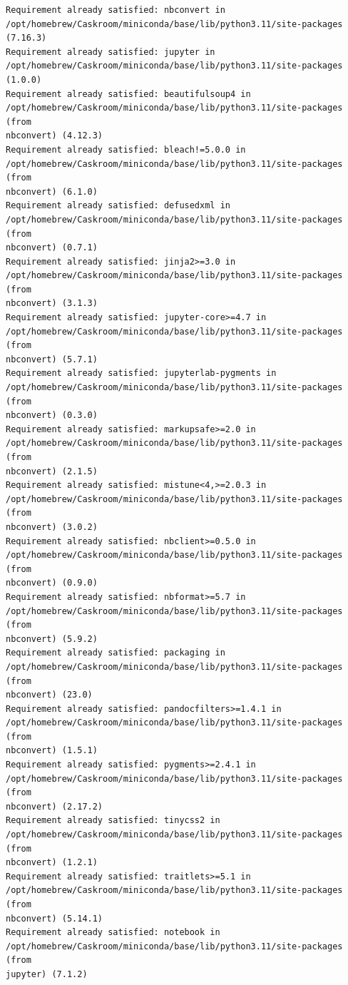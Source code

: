 \documentclass[11pt]{article}
\begin{document}
    \begin{Verbatim}[commandchars=\\\{\}]
Requirement already satisfied: nbconvert in
/opt/homebrew/Caskroom/miniconda/base/lib/python3.11/site-packages (7.16.3)
Requirement already satisfied: jupyter in
/opt/homebrew/Caskroom/miniconda/base/lib/python3.11/site-packages (1.0.0)
Requirement already satisfied: beautifulsoup4 in
/opt/homebrew/Caskroom/miniconda/base/lib/python3.11/site-packages (from
nbconvert) (4.12.3)
Requirement already satisfied: bleach!=5.0.0 in
/opt/homebrew/Caskroom/miniconda/base/lib/python3.11/site-packages (from
nbconvert) (6.1.0)
Requirement already satisfied: defusedxml in
/opt/homebrew/Caskroom/miniconda/base/lib/python3.11/site-packages (from
nbconvert) (0.7.1)
Requirement already satisfied: jinja2>=3.0 in
/opt/homebrew/Caskroom/miniconda/base/lib/python3.11/site-packages (from
nbconvert) (3.1.3)
Requirement already satisfied: jupyter-core>=4.7 in
/opt/homebrew/Caskroom/miniconda/base/lib/python3.11/site-packages (from
nbconvert) (5.7.1)
Requirement already satisfied: jupyterlab-pygments in
/opt/homebrew/Caskroom/miniconda/base/lib/python3.11/site-packages (from
nbconvert) (0.3.0)
Requirement already satisfied: markupsafe>=2.0 in
/opt/homebrew/Caskroom/miniconda/base/lib/python3.11/site-packages (from
nbconvert) (2.1.5)
Requirement already satisfied: mistune<4,>=2.0.3 in
/opt/homebrew/Caskroom/miniconda/base/lib/python3.11/site-packages (from
nbconvert) (3.0.2)
Requirement already satisfied: nbclient>=0.5.0 in
/opt/homebrew/Caskroom/miniconda/base/lib/python3.11/site-packages (from
nbconvert) (0.9.0)
Requirement already satisfied: nbformat>=5.7 in
/opt/homebrew/Caskroom/miniconda/base/lib/python3.11/site-packages (from
nbconvert) (5.9.2)
Requirement already satisfied: packaging in
/opt/homebrew/Caskroom/miniconda/base/lib/python3.11/site-packages (from
nbconvert) (23.0)
Requirement already satisfied: pandocfilters>=1.4.1 in
/opt/homebrew/Caskroom/miniconda/base/lib/python3.11/site-packages (from
nbconvert) (1.5.1)
Requirement already satisfied: pygments>=2.4.1 in
/opt/homebrew/Caskroom/miniconda/base/lib/python3.11/site-packages (from
nbconvert) (2.17.2)
Requirement already satisfied: tinycss2 in
/opt/homebrew/Caskroom/miniconda/base/lib/python3.11/site-packages (from
nbconvert) (1.2.1)
Requirement already satisfied: traitlets>=5.1 in
/opt/homebrew/Caskroom/miniconda/base/lib/python3.11/site-packages (from
nbconvert) (5.14.1)
Requirement already satisfied: notebook in
/opt/homebrew/Caskroom/miniconda/base/lib/python3.11/site-packages (from
jupyter) (7.1.2)

\end{Verbatim}
\end{document}
